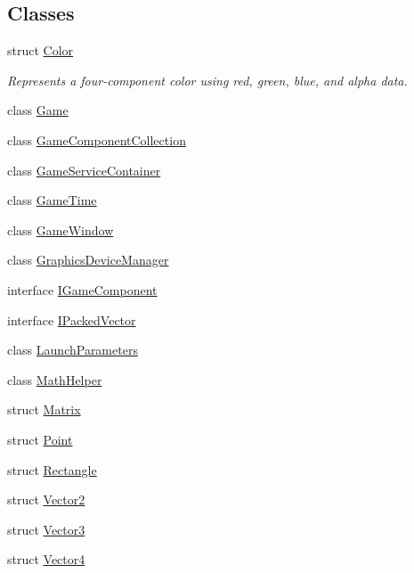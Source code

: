 \subsection*{Classes}
\begin{DoxyCompactItemize}
\item 
struct \hyperlink{structMicrosoft_1_1Xna_1_1Framework_1_1Color}{Color}
\begin{DoxyCompactList}\small\item\em Represents a four-\/component color using red, green, blue, and alpha data.\end{DoxyCompactList}\item 
class \hyperlink{classMicrosoft_1_1Xna_1_1Framework_1_1Game}{Game}
\item 
class \hyperlink{classMicrosoft_1_1Xna_1_1Framework_1_1GameComponentCollection}{Game\+Component\+Collection}
\item 
class \hyperlink{classMicrosoft_1_1Xna_1_1Framework_1_1GameServiceContainer}{Game\+Service\+Container}
\item 
class \hyperlink{classMicrosoft_1_1Xna_1_1Framework_1_1GameTime}{Game\+Time}
\item 
class \hyperlink{classMicrosoft_1_1Xna_1_1Framework_1_1GameWindow}{Game\+Window}
\item 
class \hyperlink{classMicrosoft_1_1Xna_1_1Framework_1_1GraphicsDeviceManager}{Graphics\+Device\+Manager}
\item 
interface \hyperlink{interfaceMicrosoft_1_1Xna_1_1Framework_1_1IGameComponent}{I\+Game\+Component}
\item 
interface \hyperlink{interfaceMicrosoft_1_1Xna_1_1Framework_1_1IPackedVector}{I\+Packed\+Vector}
\item 
class \hyperlink{classMicrosoft_1_1Xna_1_1Framework_1_1LaunchParameters}{Launch\+Parameters}
\item 
class \hyperlink{classMicrosoft_1_1Xna_1_1Framework_1_1MathHelper}{Math\+Helper}
\item 
struct \hyperlink{structMicrosoft_1_1Xna_1_1Framework_1_1Matrix}{Matrix}
\item 
struct \hyperlink{structMicrosoft_1_1Xna_1_1Framework_1_1Point}{Point}
\item 
struct \hyperlink{structMicrosoft_1_1Xna_1_1Framework_1_1Rectangle}{Rectangle}
\item 
struct \hyperlink{structMicrosoft_1_1Xna_1_1Framework_1_1Vector2}{Vector2}
\item 
struct \hyperlink{structMicrosoft_1_1Xna_1_1Framework_1_1Vector3}{Vector3}
\item 
struct \hyperlink{structMicrosoft_1_1Xna_1_1Framework_1_1Vector4}{Vector4}
\end{DoxyCompactItemize}
